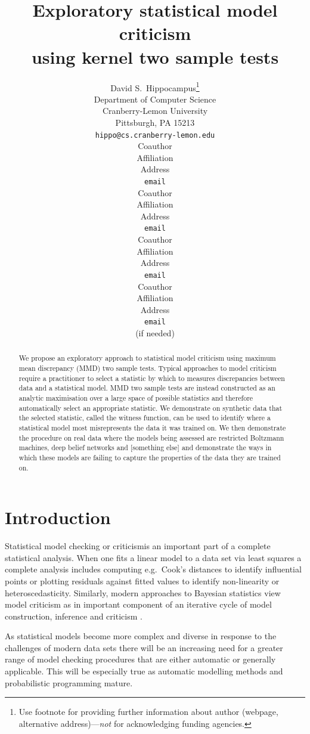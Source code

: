 \documentclass{article} %
\title{Exploratory statistical model criticism\\using kernel two sample tests}
\author{
David S.~Hippocampus\thanks{ Use footnote for providing further information
about author (webpage, alternative address)---\emph{not} for acknowledging
funding agencies.} \\
Department of Computer Science\\
Cranberry-Lemon University\\
Pittsburgh, PA 15213 \\
\texttt{hippo@cs.cranberry-lemon.edu} \\
\And
Coauthor \\
Affiliation \\
Address \\
\texttt{email} \\
\AND
Coauthor \\
Affiliation \\
Address \\
\texttt{email} \\
\And
Coauthor \\
Affiliation \\
Address \\
\texttt{email} \\
\And
Coauthor \\
Affiliation \\
Address \\
\texttt{email} \\
(if needed)\\
}
\def\eg{e.g.\ }
\begin{document}
 

\maketitle

\begin{abstract} 
We propose an exploratory approach to statistical model criticism using maximum mean discrepancy (MMD) two sample tests.
Typical approaches to model criticism require a practitioner to select a statistic by which to measures discrepancies between data and a statistical model.
MMD two sample tests are instead constructed as an analytic maximisation over a large space of possible statistics and therefore automatically select an appropriate statistic.
We demonstrate on synthetic data that the selected statistic, called the witness function, can be used to identify where a statistical model most misrepresents the data it was trained on.
We then demonstrate the procedure on real data where the models being assessed are restricted Boltzmann machines, deep belief networks and [something else] and demonstrate the ways in which these models are failing to capture the properties of the data they are trained on.
\end{abstract} 

\allowdisplaybreaks

\section{Introduction}


Statistical model checking or criticism\footnotemark is an important part of a complete statistical analysis.
When one fits a linear model to a data set via least squares a complete analysis includes computing \eg Cook's distances \cite{Cook1982-eq} to identify influential points or plotting residuals against fitted values to identify non-linearity or heteroscedasticity.
Similarly, modern approaches to Bayesian statistics view model criticism as in important component of an iterative cycle of model construction, inference and criticism \citep{Gelman2013-st}.

As statistical models become more complex and diverse in response to the challenges of modern data sets there will be an increasing need for a greater range of model checking procedures that are either automatic or generally applicable.
This will be especially true as automatic modelling methods \citep[e.g.][]{Grosse2012-zf, Lloyd2014-ABCD, Thornton2013-zg} and probabilistic programming \citep[e.g.][]{Goodman2012-pf, stan-software:2014} mature.
\end{document}
